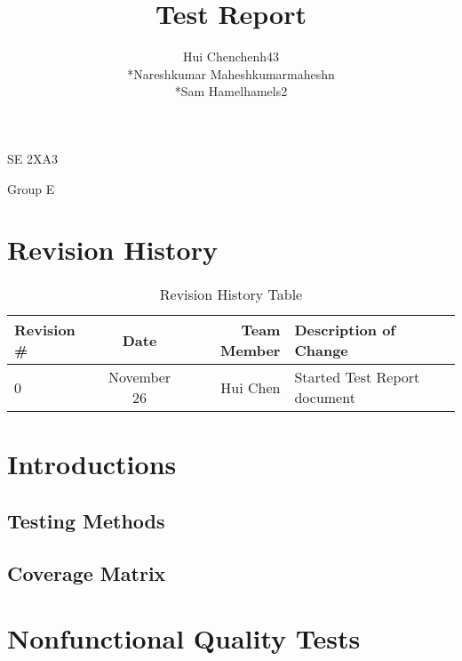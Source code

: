 \documentclass[11pt]{article}
\begin{document}
	\begin{titlepage}
	\title {Test Report}
	\maketitle
		\begin{center}
		SE 2XA3\\
		\author{
		Hui Chen\hspace{128pt}chenh43	
		\\*Nareshkumar Maheshkumar\hspace{35pt}maheshn 
		\\*Sam Hamel\hspace{118pt}hamels2 \\
		}

		Group E
		\end{center}
	\end{titlepage}
	
	\newpage
	\tableofcontents
	\listoftables
	\newpage
	
	\section{Revision History}
	\begin{table}[h]
	\caption{Revision History Table}
	\begin{tabular}{|l|c|r|p{6cm}|}
  	\hline
  	Revision \# & Date & Team Member & Description of Change\\
  	\hline
  	0 & November 26 & Hui Chen & Started Test Report document\\
  	\hline
	\end{tabular}
	\end{table}
	\newpage
	
	\section{Introductions}
	\subsection{Testing Methods}
	\subsection{Coverage Matrix}

	\section{Nonfunctional Quality Tests}	
\end{document}
